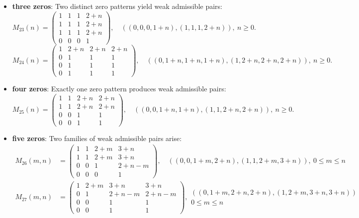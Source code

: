 \documentclass[12pt,reqno]{amsart}
\theoremstyle{plain}
\theoremstyle{definition}
\theoremstyle{remark}
\theoremstyle{definition}
\begin{document}
\begin{itemize}
    \item \textbf{three zeros}: Two distinct zero patterns yield weak admissible pairs:
    \[
    M_{23}(n) = \begin{pmatrix}
  1 & 1 & 1 & 2+n\\
1 & 1 & 1 & 2+n \\
1 & 1 & 1 & 2+n \\
0 & 0 & 0 & 1
    \end{pmatrix},\quad 
    ((0, 0, 0, 1 + n), (1, 1, 1, 2 + n)),\ n\geq 0.
    \]
    \[
    M_{24}(n) = \begin{pmatrix}
   1 & 2+n & 2+n & 2+n\\
0 & 1 & 1 & 1 \\
0 & 1 & 1 & 1 \\
0 & 1 & 1 & 1
    \end{pmatrix},\quad ((0, 1 + n, 1 + n, 1 + n), (1, 2 + n, 2 + n, 2 + n)),\ n\geq 0.
    \]
    
    \item \textbf{four zeros}: Exactly one zero pattern produces weak admissible pairs:
    \[
    M_{25}(n) = \begin{pmatrix}
   1 & 1 & 2+n & 2+n \\
1 & 1 & 2+n & 2+n \\
0 & 0 & 1 & 1 \\
0 & 0 & 1 & 1 
    \end{pmatrix},\quad ((0, 0, 1 + n, 1 + n), (1, 1, 2 + n, 2 + n)),\ n\geq 0.
    \]
    
    \item \textbf{five zeros}: Two families of weak admissible pairs arise:
    \begin{align*}
    M_{26}(m, n) &= \begin{pmatrix}
   1 & 1 & 2+m & 3+n\\
1 & 1 & 2+m & 3+n \\
0 & 0  & 1 & 2+n-m \\ 
0 & 0 & 0 & 1
    \end{pmatrix},\quad ((0, 0, 1 + m, 2 + n), (1, 1, 2 + m, 3 + n)),\ 0\leq m \leq n\\
    M_{27}(m, n) &= \begin{pmatrix}
    1 & 2+m & 3+n & 3+n\\
0 & 1 & 2+n-m & 2+n-m \\
0 & 0  & 1 & 1 \\ 
0 & 0 & 1 & 1
    \end{pmatrix},
    \begin{array}{c}
     ((0, 1 + m, 2 + n, 2 + n), (1, 2 + m, 3 + n, 3 + n))\\
    0\leq m \leq n
    \end{array}
    \end{align*}
    

\end{itemize}
\end{document}
